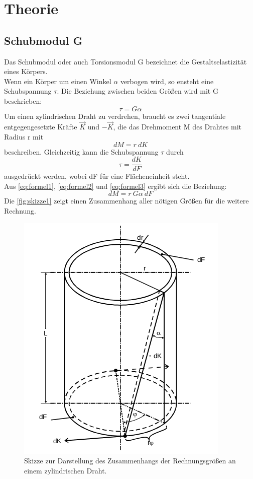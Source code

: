 \section{Theorie}
\label{sec:Theorie}

\subsection{Schubmodul G}
Das Schubmodul oder auch Torsionsmodul G bezeichnet die Gestaltselastizität eines Körpers.\\
Wenn ein Körper um einen Winkel \(\alpha\) verbogen wird, so ensteht eine Schubspannung \(\tau\).
Die Beziehung zwischen beiden Größen wird mit G beschrieben:
\begin{equation}
    \tau = G\alpha
    \label{eq:formel1}
\end{equation}
Um einen zylindrischen Draht zu verdrehen, braucht es zwei tangentiale entgegengesetzte Kräfte \(\vec{K}\) und \(-\vec{K}\), die das Drehmoment M des Drahtes mit Radius r mit
\begin{equation}
    dM = r \ dK
    \label{eq:formel2}
\end{equation}
beschreiben. 
Gleichzeitig kann die Schubspannung \(\tau\) durch
\begin{equation}
    \tau = \frac{dK}{dF}
    \label{eq:formel3}
\end{equation}
ausgedrückt werden, wobei dF für eine Flächeneinheit steht.\\
Aus \autoref{eq:formel1}, \autoref{eq:formel2} und \autoref{eq:formel3} ergibt sich die Beziehung:
\begin{equation}
    dM = r \ G\alpha \ dF
    \label{eq:formel4}
\end{equation}
\newpage
Die \autoref{fig:skizze1} zeigt einen Zusammenhang aller nötigen Größen für die weitere Rechnung.\\
\begin{figure}
    \centering
    \includegraphics[scale=0.5]{content/Bilder/Skizze1.png}
    \caption{Skizze zur Darstellung des Zusammenhangs der Rechnungsgrößen an einem zylindrischen Draht.}
    \label{fig:skizze1}
\end{figure}
